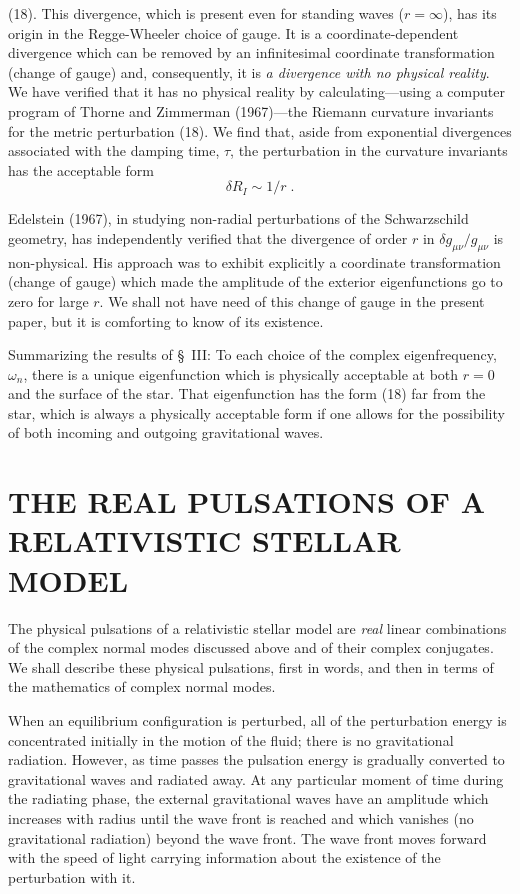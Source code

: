 (18). This divergence, which is present even for standing waves ($r = \infty$), has its origin
in the Regge-Wheeler choice of gauge. It is a coordinate-dependent divergence which
can be removed by an infinitesimal coordinate transformation (change of gauge) and,
consequently, it is \textit{a divergence with no physical reality}. We have verified that it has no
physical reality by calculating---using a computer program of Thorne and Zimmerman
(1967)---the Riemann curvature invariants for the metric perturbation (18). We find
that, aside from exponential divergences associated with the damping time, $\tau$, the
perturbation in the curvature invariants has the acceptable form
\begin{equation}
  \delta R_I \sim 1/r \;.
\end{equation}

Edelstein (1967), in studying non-radial perturbations of the Schwarzschild geometry,
has independently verified that the divergence of order $r$ in $\delta g_{\mu\nu}/g_{\mu\nu}$ is non-physical. His
approach was to exhibit explicitly a coordinate transformation (change of gauge)
which made the amplitude of the exterior eigenfunctions go to zero for large $r$. We
shall not have need of this change of gauge in the present paper, but it is comforting
to know of its existence.

Summarizing the results of \S~III: To each choice of the complex eigenfrequency,
$\omega_n$, there is a unique eigenfunction which is physically acceptable at both $r = 0$ and
the surface of the star. That eigenfunction has the form (18) far from the star, which
is always a physically acceptable form if one allows for the possibility of both incoming
and outgoing gravitational waves.

\section{THE REAL PULSATIONS OF A RELATIVISTIC STELLAR MODEL}

The physical pulsations of a relativistic stellar model are \textit{real} linear combinations of
the complex normal modes discussed above and of their complex conjugates. We shall
describe these physical pulsations, first in words, and then in terms of the mathematics
of complex normal modes.

When an equilibrium configuration is perturbed, all of the perturbation energy is
concentrated initially in the motion of the fluid; there is no gravitational radiation.
However, as time passes the pulsation energy is gradually converted to gravitational
waves and radiated away. At any particular moment of time during the radiating phase,
the external gravitational waves have an amplitude which increases with radius until the
wave front is reached and which vanishes (no gravitational radiation) beyond the wave
front. The wave front moves forward with the speed of light carrying information about
the existence of the perturbation with it.

